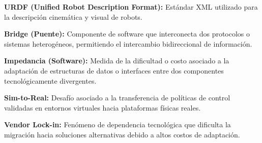 \textbf{URDF (Unified Robot Description Format):} Estándar XML utilizado para la descripción cinemática y visual de robots.

\textbf{Bridge (Puente):} Componente de software que interconecta dos protocolos o sistemas heterogéneos, permitiendo el intercambio bidireccional de información.

\textbf{Impedancia (Software):} Medida de la dificultad o costo asociado a la adaptación de estructuras de datos o interfaces entre dos componentes tecnológicamente divergentes.

\textbf{Sim-to-Real:} Desafío asociado a la transferencia de políticas de control validadas en entornos virtuales hacia plataformas físicas reales.

\textbf{Vendor Lock-in:} Fenómeno de dependencia tecnológica que dificulta la migración hacia soluciones alternativas debido a altos costos de adaptación.
